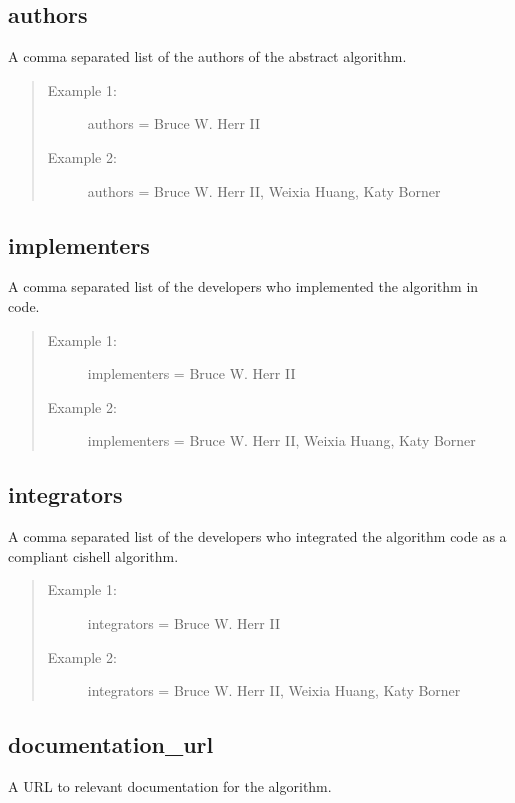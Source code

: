 \subsection*{authors}
A comma separated list of the authors of the abstract algorithm.

\begin{quote}
\begin{description}
  \item[Example 1:] authors = Bruce W. Herr II
  \item[Example 2:] authors = Bruce W. Herr II, Weixia Huang, Katy Borner 
\end{description}
\end{quote}


\subsection*{implementers}
A comma separated list of the developers who implemented the algorithm in code.

\begin{quote}
\begin{description}
  \item[Example 1:] implementers = Bruce W. Herr II
  \item[Example 2:] implementers = Bruce W. Herr II, Weixia Huang, Katy Borner 
\end{description}
\end{quote}


\subsection*{integrators}
A comma separated list of the developers who integrated the algorithm code as
a compliant cishell algorithm.

\begin{quote}
\begin{description}
  \item[Example 1:] integrators = Bruce W. Herr II
  \item[Example 2:] integrators = Bruce W. Herr II, Weixia Huang, Katy Borner 
\end{description}
\end{quote}


\subsection*{documentation\_url}
A URL to relevant documentation for the algorithm.

